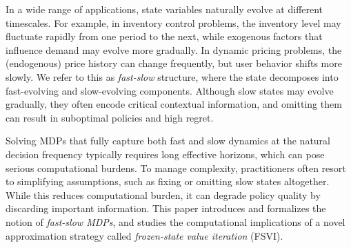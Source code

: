 \documentclass[11pt, notitlepage]{article}
\newcommand{\1}{\mathbbm{1}}
\begin{document}
In a wide range of applications, state variables naturally evolve at different timescales. For example, in inventory control problems, the inventory level may fluctuate rapidly from one period to the next, while exogenous factors that influence demand may evolve more gradually. In dynamic pricing problems, the (endogenous) price history can change frequently, but user behavior shifts more slowly. We refer to this as \emph{fast-slow} structure, where the state decomposes into fast-evolving and slow-evolving components. Although slow states may evolve gradually, they often encode critical contextual information, and omitting them can result in suboptimal policies and high regret.


Solving MDPs that fully capture both fast and slow dynamics at the natural decision frequency typically requires long effective horizons, which can pose serious computational burdens. To manage complexity, practitioners often resort to simplifying assumptions, such as fixing or omitting slow states altogether. While this reduces computational burden, it can degrade policy quality by discarding important information. This paper introduces and formalizes the notion of \emph{fast-slow MDPs}, and studies the computational implications of a novel approximation strategy called \emph{frozen-state value iteration} (FSVI).
\end{document}
